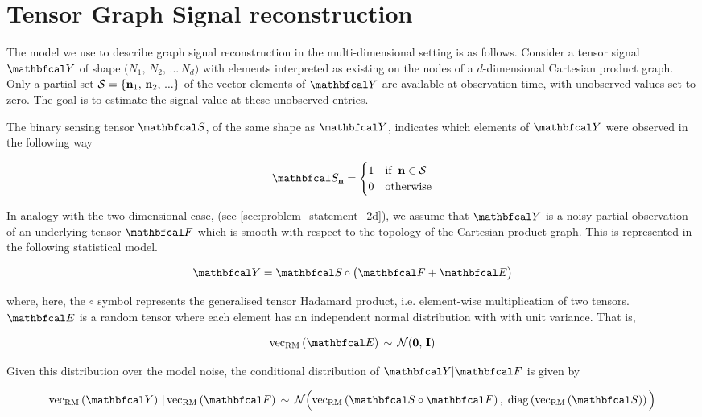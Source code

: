 \section{Tensor Graph Signal reconstruction}

The model we use to describe graph signal reconstruction in the multi-dimensional setting is as follows. Consider a tensor signal $\Yt$ of shape $\big(N_1, \, N_2, \, ... \, N_d \big)$ with elements interpreted as existing on the nodes of a $d$-dimensional Cartesian product graph. Only a partial set $\mathcal{S} = \{\mathbf{n}_1, \, \mathbf{n}_2, \, ... \}$ of the vector elements of $\Yt$ are available at observation time, with unobserved values set to zero. The goal is to estimate the signal value at these unobserved entries. 

The binary sensing tensor $\St$, of the same shape as $\Yt$, indicates which elements of $\Yt$ were observed in the following way 

\begin{equation}
    \St_{\nn} = \begin{cases}
        1 & \text{if} \;\; \nn \in \mathcal{S} \\
        0 & \text{otherwise}
    \end{cases}
\end{equation}

In analogy with the two dimensional case, (see \cref{sec:problem_statement_2d}), we assume that $\Yt$ is a noisy partial observation of an underlying tensor $\Ft$ which is smooth with respect to the topology of the Cartesian product graph. This is represented in the following statistical model. 

\begin{equation}
    \Yt = \St \circ \big(\Ft + \Et \big)
\end{equation}

where, here, the $\circ$ symbol represents the generalised tensor Hadamard product, i.e. element-wise multiplication of two tensors. $\Et$ is a random tensor where each element has an independent normal distribution with with unit variance. That is,

\begin{equation}
    \vecrm{\Et} \, \sim \, \mathcal{N}(\mathbf{0}, \, \I)
\end{equation}

Given this distribution over the model noise, the conditional distribution of $\Yt |  \Ft$ is given by 

\begin{equation}
    \vecrm{\Yt} \, | \, \vecrm{\Ft} \, \sim \, \mathcal{N}\Big(\vecrm{\St \circ \Ft}, \; \diag{\vecrm{\St}}\Big)
\end{equation}


